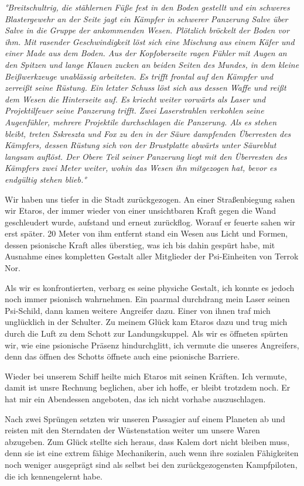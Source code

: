 \documentclass[11pt]{scrartcl}
\begin{document}
\emph{°Breitschultrig, die stählernen Füße fest in den Boden gestellt
und ein schweres Blastergewehr an der Seite jagt ein Kämpfer in schwerer
Panzerung Salve über Salve in die Gruppe der ankommenden Wesen.
Plötzlich bröckelt der Boden vor ihm. Mit rasender Geschwindigkeit löst
sich eine Mischung aus einem Käfer und einer Made aus dem Boden. Aus der
Kopfoberseite ragen Fühler mit Augen an den Spitzen und lange Klauen
zucken an beiden Seiten des Mundes, in dem kleine Beißwerkzeuge
unablässig arbeiteten. Es trifft frontal auf den Kämpfer und zerreißt
seine Rüstung. Ein letzter Schuss löst sich aus dessen Waffe und reißt
dem Wesen die Hinterseite auf. Es kriecht weiter vorwärts als Laser und
Projektilfeuer seine Panzerung trifft. Zwei Laserstrahlen verkohlen
seine Augenfühler, mehrere Projektile durchschlagen die Panzerung. Als
es stehen bleibt, treten Sskreszta und Fox zu den in der Säure
dampfenden Überresten des Kämpfers, dessen Rüstung sich von der
Brustplatte abwärts unter Säureblut langsam auflöst. Der Obere Teil
seiner Panzerung liegt mit den Überresten des Kämpfers zwei Meter
weiter, wohin das Wesen ihn mitgezogen hat, bevor es endgültig stehen
blieb.°}

Wir haben uns tiefer in die Stadt zurückgezogen. An einer Straßenbiegung
sahen wir Etaros, der immer wieder von einer unsichtbaren Kraft gegen
die Wand geschleudert wurde, aufstand und erneut zurückflog. Worauf er
feuerte sahen wir erst später. 20 Meter von ihm entfernt stand ein Wesen
aus Licht und Formen, dessen psionische Kraft alles überstieg, was ich
bis dahin gespürt habe, mit Ausnahme eines kompletten Gestalt aller
Mitglieder der Psi-Einheiten von Terrok Nor.

Als wir es konfrontierten, verbarg es seine physiche Gestalt, ich konnte
es jedoch noch immer psionisch wahrnehmen. Ein paarmal durchdrang mein
Laser seinen Psi-Schild, dann kamen weitere Angreifer dazu. Einer von
ihnen traf mich unglücklich in der Schulter. Zu meinem Glück kam Etaros
dazu und trug mich durch die Luft zu dem Schott zur Landungskuppel. Als
wir es öffneten spürten wir, wie eine psionische Präsenz hindurchglitt,
ich vermute die unseres Angreifers, denn das öffnen des Schotts öffnete
auch eine psionische Barriere.

Wieder bei unserem Schiff heilte mich Etaros mit seinen Kräften. Ich
vermute, damit ist unsre Rechnung beglichen, aber ich hoffe, er bleibt
trotzdem noch. Er hat mir ein Abendessen angeboten, das ich nicht
vorhabe auszuschlagen.

Nach zwei Sprüngen setzten wir unseren Passagier auf einem Planeten ab
und reisten mit den Sterndaten der Wüstenstation weiter um unsere Waren
abzugeben. Zum Glück stellte sich heraus, dass Kalem dort nicht bleiben
muss, denn sie ist eine extrem fähige Mechanikerin, auch wenn ihre
sozialen Fähigkeiten noch weniger ausgeprägt sind als selbst bei den
zurückgezogensten Kampfpiloten, die ich kennengelernt habe.
\end{document}
